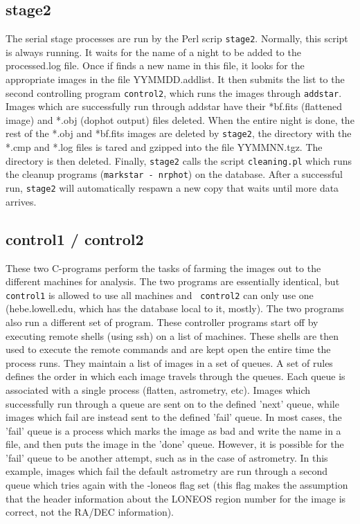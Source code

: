 \documentclass{article}
\begin{document}
\subsection{stage2}
The serial stage processes are run by the Perl scrip {\tt stage2}.
Normally, this script is always running.  It waits for the name of a
night to be added to the processed.log file.  Once if finds a new name
in this file, it looks for the appropriate images in the file
YYMMDD.addlist.  It then submits the list to the second controlling
program {\tt control2}, which runs the images through {\tt addstar}.
Images which are successfully run through addstar have their *bf.fits
(flattened image) and *.obj (dophot output) files deleted.  When the
entire night is done, the rest of the *.obj and *bf.fits images are
deleted by {\tt stage2}, the directory with the *.cmp and *.log files
is tared and gzipped into the file YYMMNN.tgz.  The directory is then
deleted.  Finally, {\tt stage2} calls the script {\tt cleaning.pl}
which runs the cleanup programs ({\tt markstar - nrphot}) on the
database.  After a successful run, {\tt stage2} will automatically
respawn a new copy that waits until more data arrives.

\subsection{control1 / control2}
These two C-programs perform the tasks of farming the images out to
the different machines for analysis.  The two programs are essentially
identical, but {\tt control1} is allowed to use all machines and {\tt
control2} can only use one (hebe.lowell.edu, which has the database
local to it, mostly).  The two programs also run a different set of
program.  These controller programs start off by executing remote
shells (using ssh) on a list of machines.  These shells are then used
to execute the remote commands and are kept open the entire time the
process runs.  They maintain a list of images in a set of queues.  A
set of rules defines the order in which each image travels through the
queues.  Each queue is associated with a single process (flatten,
astrometry, etc).  Images which successfully run through a queue are
sent on to the defined 'next' queue, while images which fail are
instead sent to the defined 'fail' queue.  In most cases, the 'fail'
queue is a process which marks the image as bad and write the name in
a file, and then puts the image in the 'done' queue.  However, it is
possible for the 'fail' queue to be another attempt, such as in the
case of astrometry.  In this example, images which fail the default
astrometry are run through a second queue which tries again with the
-loneos flag set (this flag makes the assumption that the header
information about the LONEOS region number for the image is correct,
not the RA/DEC information).
\end{document}
